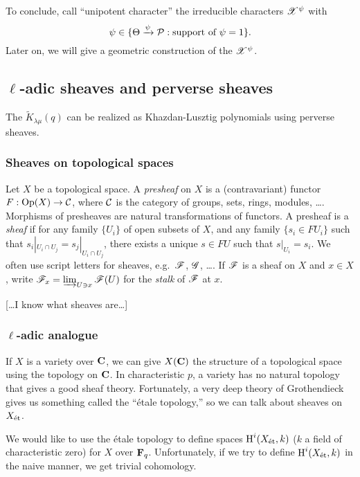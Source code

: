 To conclude, call ``unipotent character'' the irreducible characters 
$\mathscr{X}^\psi$ with 
\[
  \psi\in \{\Theta\xrightarrow\psi\mathcal{P}:\text{support of }\psi=1\} .
\]
Later on, we will give a geometric construction of the 
$\mathscr{X}^\psi$. 





\subsection{\texorpdfstring{$\ell$}{l}-adic sheaves and perverse sheaves}

The $\widetilde K_{\lambda\mu}(q)$ can be realized as Khazdan-Lusztig polynomials 
using perverse sheaves. 


\subsubsection{Sheaves on topological spaces}

Let $X$ be a topological space. A \emph{presheaf} on $X$ is a (contravariant) 
functor $F:\operatorname{Op}(X) \to \mathcal{C}$, where $\mathcal{C}$ is the category of groups, sets, 
rings, modules, \ldots. Morphisms of presheaves are natural transformations of 
functors. A presheaf is a \emph{sheaf} if for any family $\{U_i\}$ of open 
subsets of $X$, and any family $\{s_i\in F U_i\}$ such that 
$s_i|_{U_i\cap U_j} = s_j|_{U_i\cap U_j}$, there exists a unique 
$s\in F U$ such that $s|_{U_i} = s_i$. We often use script letters for sheaves, 
e.g.\ $\mathscr{F}$, $\mathscr{G}$, \ldots. If $\mathscr{F}$ is a sheaf on $X$ and $x\in X$, write 
$\mathscr{F}_x=\varinjlim_{U\ni x} \mathscr{F}(U)$ for the \emph{stalk} of $\mathscr{F}$ at $x$. 

[\ldots I know what sheaves are\ldots]


\subsubsection{\texorpdfstring{$\ell$}{l}-adic analogue}

If $X$ is a variety over $\mathbf{C}$, we can give $X(\mathbf{C})$ the structure of a topological 
space using the topology on $\mathbf{C}$. In characteristic $p$, a variety has no natural 
topology that gives a good sheaf theory. Fortunately, a very deep theory of 
Grothendieck gives us something called the ``\'etale topology,'' so we can talk 
about sheaves on $X_{\textnormal{\'et}}$. 

We would like to use the \'etale topology to define spaces $\operatorname{H}^i(X_{\textnormal{\'et}},k)$ ($k$ a 
field of characteristic zero) for $X$ over $\mathbf{F}_q$. Unfortunately, if we try to 
define $\operatorname{H}^i(X_{\textnormal{\'et}}, k)$ in the naive manner, we get trivial cohomology. 

